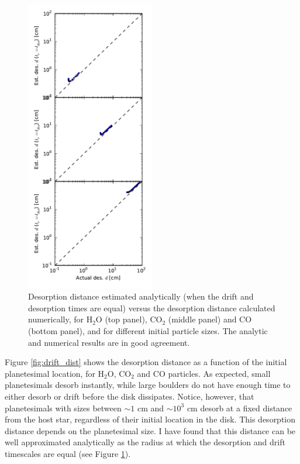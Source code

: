 \documentclass[manuscript]{aastex}
\begin{document}
\begin{figure}[htb]
\centering
\includegraphics[width=0.5\textwidth]{../figs/desorption_distance_actual_vs_estimated.pdf}
\caption{Desorption distance estimated analytically (when the drift and desorption times are equal) versus the desorption distance calculated numerically, for H$_2$O (top panel), CO$_2$ (middle panel) and CO (bottom panel), and for different initial particle sizes. The analytic and numerical results are in good agreement.} %
\label{fig:an_vs_num}
\end{figure}

Figure \ref{fig:drift_dist} shows the desorption distance as a function of the initial planetesimal location, for H$_2$O, CO$_2$ and CO particles. As expected, small planetesimals desorb instantly, while large boulders do not have enough time to either desorb or drift before the disk dissipates. Notice, however, that planetesimals with sizes between $\sim 1$ cm and $\sim 10^3$ cm desorb at a fixed distance from the host star, regardless of their initial location in the disk. This desorption distance depends on the planetesimal size. I have found that this distance can be well approximated analytically as the radius at which the desorption and drift timescales are equal (see Figure \ref{fig:an_vs_num}). %
\end{document}
